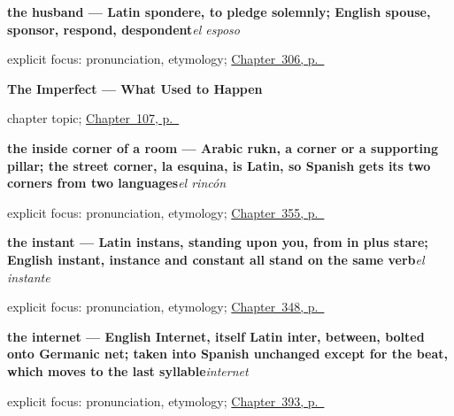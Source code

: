 \noindent\begin{minipage}[t]{\linewidth}
\raggedright
\textbf{the husband --- Latin spondere, to pledge solemnly; English spouse, sponsor, respond, despondent}\enspace\emph{el esposo}\par
\footnotesize explicit focus: pronunciation, etymology; \hyperref[ch:hijos-y-abuelos]{Chapter~306, p.~\pageref*{ch:hijos-y-abuelos}}
\end{minipage}\par\smallskip

\noindent\begin{minipage}[t]{\linewidth}
\raggedright
\textbf{The Imperfect --- What Used to Happen}\par
\footnotesize chapter topic; \hyperref[ch:spanish-imperfecto]{Chapter~107, p.~\pageref*{ch:spanish-imperfecto}}
\end{minipage}\par\smallskip

\noindent\begin{minipage}[t]{\linewidth}
\raggedright
\textbf{the inside corner of a room — Arabic rukn, a corner or a supporting pillar; the street corner, la esquina, is Latin, so Spanish gets its two corners from two languages}\enspace\emph{el rincón}\par
\footnotesize explicit focus: pronunciation, etymology; \hyperref[ch:la-pared-y-el-techo]{Chapter~355, p.~\pageref*{ch:la-pared-y-el-techo}}
\end{minipage}\par\smallskip

\noindent\begin{minipage}[t]{\linewidth}
\raggedright
\textbf{the instant — Latin instans, standing upon you, from in plus stare; English instant, instance and constant all stand on the same verb}\enspace\emph{el instante}\par
\footnotesize explicit focus: pronunciation, etymology; \hyperref[ch:el-principio-y-el-fin]{Chapter~348, p.~\pageref*{ch:el-principio-y-el-fin}}
\end{minipage}\par\smallskip

\noindent\begin{minipage}[t]{\linewidth}
\raggedright
\textbf{the internet — English Internet, itself Latin inter, between, bolted onto Germanic net; taken into Spanish unchanged except for the beat, which moves to the last syllable}\enspace\emph{internet}\par
\footnotesize explicit focus: pronunciation, etymology; \hyperref[ch:el-ordenador-y-el-correo-electronico]{Chapter~393, p.~\pageref*{ch:el-ordenador-y-el-correo-electronico}}
\end{minipage}\par\smallskip

